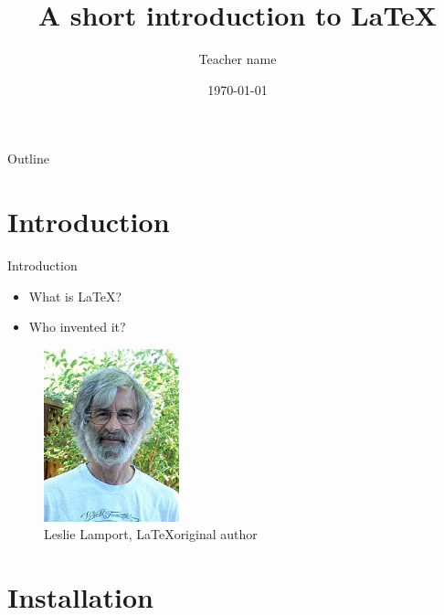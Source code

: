 \documentclass{beamer}
\title[\LaTeX intro]{A short introduction to \LaTeX}
\author{Teacher name}
\institute{LinuxUPC}
\date{\today}
\begin{document}
\begin{frame}
  \titlepage
\end{frame}


\begin{frame}{Outline}
  \tableofcontents
\end{frame}

\section{Introduction}

\begin{frame}{Introduction}

\begin{itemize}
  \item What is \LaTeX?
  \item Who invented it?
\end{itemize}
\begin{figure}
\includegraphics[width=0.35\textwidth]{graphics/author.jpg}
\caption{\label{fig:latexCreator}{Leslie Lamport, \LaTeX original author}}
\end{figure}

\vskip 1cm
\end{frame}

\section{Installation}
\end{document}
